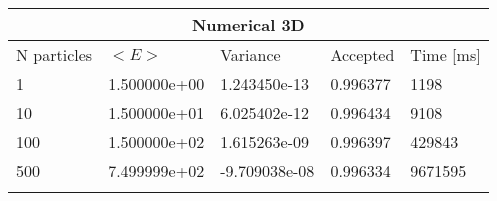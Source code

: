 \begin{tabular}{|l|l|l|l|l|}
\hline 
\multicolumn{5}{|c|}{Numerical 3D}\\ 
\hline 
N particles & $<E>$ & Variance & Accepted & Time [ms]\\ 
 \hline 
1 & 1.500000e+00 & 1.243450e-13 & 0.996377 & 1198 \\ \hline 
10 & 1.500000e+01 & 6.025402e-12 & 0.996434 & 9108 \\ \hline 
100 & 1.500000e+02 & 1.615263e-09 & 0.996397 & 429843 \\ \hline 
500 & 7.499999e+02 & -9.709038e-08 & 0.996334 & 9671595 \\ \hline 
\label{i:n3} 
\end{tabular}